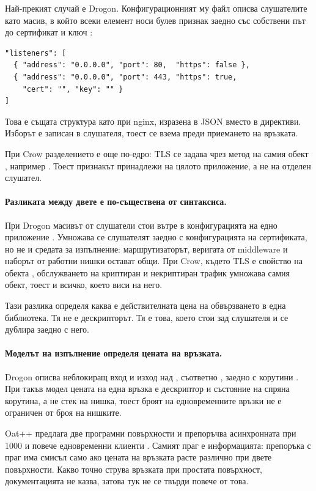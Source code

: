 Най-прекият случай е Drogon. Конфигурационният му файл описва слушателите като масив, в който
всеки елемент носи булев признак  заедно със собствени път до сертификат и ключ
\cite{drogonconfig}:

\begin{lstlisting}[caption={Слушатели в конфигурацията на Drogon},label={lst:drogon-listeners}]
"listeners": [
  { "address": "0.0.0.0", "port": 80,  "https": false },
  { "address": "0.0.0.0", "port": 443, "https": true,
    "cert": "", "key": "" }
]
\end{lstlisting}

Това е същата структура като при nginx, изразена в JSON вместо в директиви. Изборът е записан
в слушателя, тоест се взема преди приемането на връзката.

При Crow разделението е още по-едро: TLS се задава чрез метод на самия обект ,
например  \cite{crowssl}. Тоест признакът принадлежи на цялото
приложение, а не на отделен слушател.

\paragraph{Разликата между двете е по-съществена от синтаксиса.} При Drogon масивът от
слушатели стои вътре в конфигурацията на едно приложение \cite{drogonconfig}. Умножава се
слушателят заедно с конфигурацията на сертификата, но не и средата за изпълнение:
маршрутизаторът, веригата от middleware и наборът от работни нишки остават общи. При Crow,
където TLS е свойство на обекта  \cite{crowssl}, обслужването на криптиран и
некриптиран трафик умножава самия обект, тоест и всичко, което виси на него.

Тази разлика определя каква е действителната цена на обвързването в една библиотека. Тя не е
дескрипторът. Тя е това, което стои зад слушателя и се дублира заедно с него.

\paragraph{Моделът на изпълнение определя цената на връзката.} Drogon описва неблокиращ вход и
изход над , съответно , заедно с корутини \cite{drogon}. При такъв
модел цената на една връзка е дескриптор и състояние на спряна корутина, а не стек на нишка,
тоест броят на едновременните връзки не е ограничен от броя на нишките.

Oat++ предлага две програмни повърхности и препоръчва асинхронната при 1000 и повече
едновременни клиенти \cite{oatppapi}. Самият праг е информацията: препоръка с праг има смисъл
само ако цената на връзката расте различно при двете повърхности. Какво точно струва връзката
при простата повърхност, документацията не казва, затова тук не се твърди повече от това.

